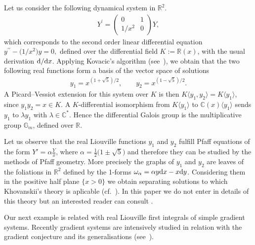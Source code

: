 \documentclass[10pt,a4paper]{amsart}
\numberwithin{equation}{section}
\newcommand{\R}{\mathbb{R}}
\newcommand{\C}{\mathbb{C}}
\begin{document}
\begin{Example} Let us consider the following dynamical system in $\mathbb{R}^2$.
\begin{gather*}
Y^{\prime}=\begin{pmatrix} 0 & 1 \\ 1/x^{2} & 0 \end{pmatrix}Y,
\end{gather*}
which corresponds to the second order linear differential equation $y^{\prime \prime
}-\big(1/x^{2}\big)y=0,$ defined over the differential field $K:=\mathbb{R}(x)$, with the usual derivation ${\rm d}/{\rm d}x$. Applying Kovacic's algorithm
(see~\cite[Section~7.3]{CHgsm}), we obtain that the two following real functions form a basis of the vector space of solutions
\begin{gather*}
y_{1}=x^{(1+\sqrt{5})/2}, \qquad y_{2}=x^{(1-\sqrt{5})/2}.
\end{gather*}
A Picard--Vessiot extension for this system over
$K$ is then $K\langle y_1, y_2 \rangle = K \langle y_1 \rangle$, since $y_{1}y_{2}=x\! \in\! K$. A $K$-differential isomorphism from $K \langle y_1 \rangle$ to $\C(x)\langle y_1 \rangle$ sends $y_{1}$ to $\lambda y_{1}$ with $\lambda \in \C^{\ast }$. Hence the differential Galois group is the multiplicative group $\mathbb{G}_m$, defined over $\R$.

Let us observe that the real Liouville functions $y_1$ and $y_2$ fulfill Pfaff equations of the form $Y'=\alpha \frac{Y}{x}$, where $\alpha= \frac 1 2 \big(1\pm \sqrt{5}\big)$ and therefore they can be studied by the methods of Pfaff geometry. More precisely the graphs of $y_{1}$ and $y_{2}$ are leaves of the foliations
in $\mathbb{R}^2$ defined by the 1-forms $\omega _{\alpha }=\alpha y{\rm d}x-x{\rm d}y$. Considering them in the positive half plane $\{x>0\}$ we obtain separating solutions to which Khovanskii's theory is aplicable (cf.\ \cite[pp.~4 and~5]{Kh}). In this paper we do not enter in details of this theory but an interested reader can consult \cite{Kh}.
\end{Example}

Our next example is related with real Liouville first integrals of simple gradient systems. Recently gradient systems are intensively studied in relation with the gradient conjecture and its generalisations (see~\cite{ARTH,CM}).
\end{document}
